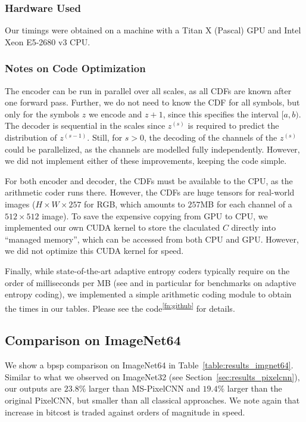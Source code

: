 \documentclass[10pt,twocolumn,letterpaper]{article}
\begin{document}
\subsubsection{Hardware Used}

Our timings were obtained on a machine with a Titan X (Pascal) GPU and Intel Xeon E5-2680 v3 CPU.


\subsubsection{Notes on Code Optimization} \label{sec:notes_optim}

The encoder can be run in parallel over all scales, as all CDFs are known after one forward pass. Further, we do not need to know the CDF for all symbols, but only for the symbols $z$ we encode and $z+1$, since this specifies the interval $[a, b)$. 
The decoder is sequential in the scales since $z^{(s)}$ is required to predict the distribution of $z^{(s-1)}$. Still, for $s>0$, the decoding of the channels of the $z^{(s)}$ could be parallelized, as the channels are modelled fully independently.
However, we did not implement either of these improvements, keeping the code simple.

For both encoder and decoder, the CDFs must be available to the CPU, as the arithmetic coder runs there. However, the CDFs are huge tensors for real-world images ($H \times W \times 257$ for RGB, which amounts to $257$MB for each channel of a $512 \times 512$ image). To save the expensive copying from GPU to CPU, we implemented our own CUDA kernel to store the claculated $C$ directly into ``managed memory'', which can be accessed from both CPU and GPU. However, we did not optimize this CUDA kernel for speed.

Finally, while state-of-the-art adaptive entropy coders typically require on the order of milliseconds per MB (see \cite{duda2015use} and in particular \cite{giesen2014interleaved} for benchmarks on adaptive entropy coding), we implemented a simple arithmetic coding module to obtain the times in our tables.
Please see the code\textsuperscript{\ref{fn:github}} for details.

\newpage



\subsection{Comparison on ImageNet64} \label{sec:imgnet64_cmp}

We show a bpsp comparison on ImageNet64 in Table~\ref{table:results_imgnet64}. Similar to what we observed on ImageNet32 (see Section~\ref{sec:results_pixelcnn}), our outputs are $23.8\%$ larger than MS-PixelCNN and $19.4\%$ larger than the original PixelCNN, but smaller than all classical approaches. We note again that increase in bitcost is traded against orders of magnitude in speed. 
\end{document}
